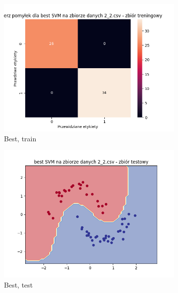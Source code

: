 \documentclass[12pt]{article}
\newcommand*{\subfigwidth}{0.24\textwidth}
\begin{document}
\begin{figure}[H]
\begin{subfigure}[t]{\subfigwidth}
        \includegraphics[width=\linewidth]{img/exp_3/svm/2_2/best/train_matrix.png}
        \caption{Best, train}
    \end{subfigure}
    \hfill
    \begin{subfigure}[t]{\subfigwidth}
        \includegraphics[width=\linewidth]{img/exp_3/svm/2_2/best/test_boundary.png}
        \caption{Best, test}
    \end{subfigure}
    \hfill
    \begin{subfigure}[t]{\subfigwidth}

\end{subfigure}
\end{figure}
\end{document}
